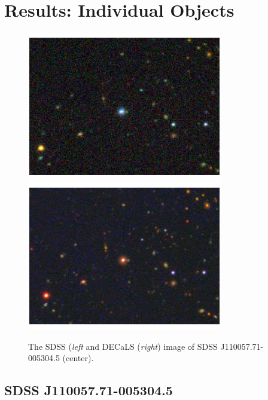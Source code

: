 \documentclass{emulateapj}
\begin{document}
\section{Results: Individual Objects}
\begin{figure}
  \includegraphics[width=8.50cm, height=6.50cm, trim=0.0cm 0.0cm 0.0cm 0.0cm, clip]
  {../images/J110057_sdss_image_nolabels.pdf}
  \includegraphics[width=8.50cm, height=6.50cm, trim=0.0cm 0.0cm 0.0cm 0.0cm, clip]
  {../images/J110057_decals_image_nolabels.pdf}
  \centering
  \caption[]{The SDSS ({\it left} and DECaLS ({\it right}) image of SDSS J110057.71-005304.5 (center). } 
\label{fig:w1100m0052_sdss}
\end{figure}


\subsection{SDSS J110057.71-005304.5}
\end{document}
